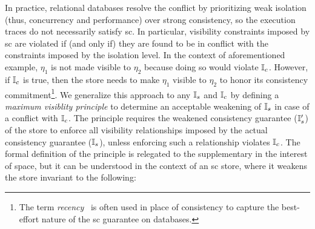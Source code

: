 In practice, relational databases resolve the conflict by prioritizing
weak isolation (thus, concurrency and performance) over strong
consistency, so the execution traces do not necessarily satisfy {\sc
sc}. In particular, visibility constraints imposed by {\sc sc} are
violated if (and only if) they are found to be in conflict with the
constraints imposed by the isolation level. In the context of
aforementioned example, $\eta_1$ is not made visible to $\eta_2$
because doing so would violate $\mathbb{I}_c$. However, if $\mathbb{I}_c$ is true,
then the store needs to make $\eta_1$ visible to $\eta_2$ to honor its
consistency commitment\footnote{The term
\emph{recency}~\cite{bailisvldb} is often used in place of consistency
to capture the best-effort nature of the {\sc sc} guarantee on
databases.}. We generalize this approach to any $\mathbb{I}_s$ and $\mathbb{I}_c$ by
defining a \emph{maximum visiblity principle} to determine an
acceptable weakening of $\mathbb{I}_s$ in case of a conflict with $\mathbb{I}_c$.  The
principle requires the weakened consistency guarantee ($\mathbb{I}_s'$) of the
store to enforce all visibility relationships imposed by the actual
consistency guarantee ($\mathbb{I}_s$), unless enforcing such a relationship
violates $\mathbb{I}_c$. The formal definition of the principle is relegated
to the supplementary in the interest of space, but it can be
understood in the context of an {\sc sc} store, where it weakens the
store invariant to the following:

